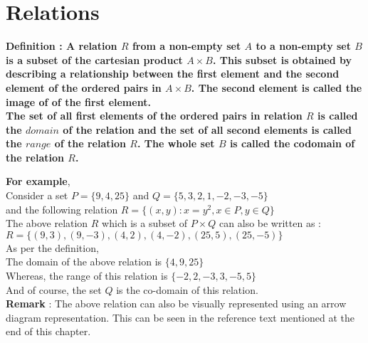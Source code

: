 \documentclass[12pt, letterpaper]{article}
\begin{document}
\section{Relations}
\begin{displayquote}
\textbf{Definition : A relation $R$ from a non-empty set $A$ to a non-empty set $B$ is a subset of the cartesian product $A \times B$. This subset is obtained by describing a relationship between the first element and the second element of the ordered pairs in $A \times B$. The second element is called the  image of of the first element.\\
The set of all first elements of the ordered pairs in relation $R$ is called the $domain$ of the relation and the set of all second elements is called the $range$ of the relation $R$. The whole set $B$ is called the codomain of the relation $R$.}
\end{displayquote}
\textbf{For example},\\
 Consider a set $P = \{9,4,25\}$ and $Q = \{5,3,2,1,-2,-3,-5\}$\\
 and the following relation $R = \{(x,y) : x = y^2, x \in P, y \in Q\}$\\
The above relation $R$ which is a subset of $P \times Q$ can also be written as :\\
$R = \{(9,3), (9,-3), (4,2), (4,-2), (25,5), (25,-5)\}$\\
As per the definition, \\
The domain of the above relation is $\{4,9,25\}$\\
Whereas, the range of this relation is $\{-2,2,-3,3,-5,5\}$\\
And of course, the set $Q$ is the co-domain of this relation.\\
\textbf{Remark} : The above relation can also be visually represented using an arrow diagram representation. This can be seen in the reference text mentioned at the end of this chapter.
\end{document}
